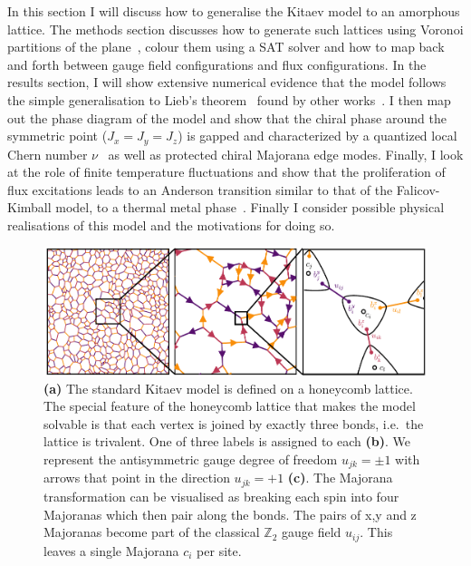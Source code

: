 In this section I will discuss how to generalise the Kitaev model to an amorphous lattice. The methods section discusses how to generate such lattices using Voronoi partitions of the plane~\autocite{mitchellAmorphousTopologicalInsulators2018,marsalTopologicalWeaireThorpeModels2020}, colour them using a SAT solver and how to map back and forth between gauge field configurations and flux configurations. In the results section, I will show extensive numerical evidence that the model follows the simple generalisation to Lieb's theorem~\autocite{lieb_flux_1994} found by other works~\autocite{eschmannThermodynamicClassificationThreedimensional2020,Yao2009,eschmann2019thermodynamics,Peri2020}. I then map out the phase diagram of the model and show that the chiral phase around the symmetric point (\(J_x = J_y = J_z\)) is gapped and characterized by a quantized local Chern number \(\nu\)~\autocite{peru_preprint,mitchellAmorphousTopologicalInsulators2018} as well as protected chiral Majorana edge modes. Finally, I look at the role of finite temperature fluctuations and show that the proliferation of flux excitations leads to an Anderson transition similar to that of the Falicov-Kimball model, to a thermal metal phase~\autocite{Laumann2012,lahtinenTopologicalLiquidNucleation2012,selfThermallyInducedMetallic2019}. Finally I consider possible physical realisations of this model and the motivations for doing so.

\hypertarget{fig:amk-zoom}{%
\begin{figure}
\centering
\includegraphics[width=1\textwidth,height=\textheight]{figure_code/amk_chapter/intro/amk_zoom/amk_zoom_by_hand}
\caption[{The Kitaev Honeycomb Model}]{\textbf{(a)} The standard Kitaev model is defined on a honeycomb lattice. The special feature of the honeycomb lattice that makes the model solvable is that each vertex is joined by exactly three bonds, i.e.~the lattice is trivalent. One of three labels is assigned to each \textbf{(b)}. We represent the antisymmetric gauge degree of freedom \(u_{jk} = \pm 1\) with arrows that point in the direction \(u_{jk} = +1\) \textbf{(c)}. The Majorana transformation can be visualised as breaking each spin into four Majoranas which then pair along the bonds. The pairs of x,y and z Majoranas become part of the classical \(\mathbb{Z}_2\) gauge field \(u_{ij}\). This leaves a single Majorana \(c_i\) per site.}
\label{fig:amk-zoom}
\end{figure}
}

